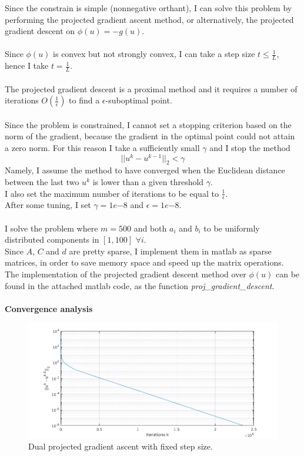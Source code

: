 \documentclass[]{article}
\begin{document}
Since the constrain is simple (nonnegative orthant), I can solve this problem by performing the projected gradient ascent method, or alternatively, the projected gradient descent on $\phi(u) = -g(u)$.\\\\
Since $\phi(u)$ is convex but not strongly convex, I can take a step size $t \leq \frac{1}{L}$, hence I take $t = \frac{1}{L}$.\\\\
The projected gradient descent is a proximal method and it requires a number of iterations $O(\frac{1}{\epsilon})$ to find a $\epsilon$-suboptimal point.\\\\
Since the problem is constrained, I cannot set a stopping criterion based on the norm of the gradient, because the gradient in the optimal point could not attain a zero norm. For this reason I take a sufficiently small $\gamma$ and I stop the method 
\[
||u^k-u^{k-1}||_2 < \gamma
\]
Namely, I assume the method to have converged when the Euclidean distance between the last two $u^k$ is lower than a given threshold $\gamma$.\\
I also set the maximum number of iterations to be equal to $\frac{1}{\epsilon}$.\\
After some tuning, I set $\gamma=1e{-8}$ and $\epsilon=1e{-8}$.\\\\
I solve the problem where $m=500$ and  both $a_i$ and $b_i$ to be uniformly distributed components in $[1,100]$ $\forall i$.\\
Since $A$, $C$ and $d$ are pretty sparse, I implement them in matlab as sparse matrices, in order to save memory space and speed up the matrix operations.\\
The implementation of the projected gradient descent method over $\phi(u)$ can be found in the attached matlab code, as the function \textit{proj\_gradient\_descent}.\\\\
\textbf{Convergence analysis}
\begin{figure}[H]
	\includegraphics[scale=0.55]{2_2.png}
	\caption{Dual projected gradient ascent with fixed step size.}
	\label{2_2}
\end{figure}
\end{document}
